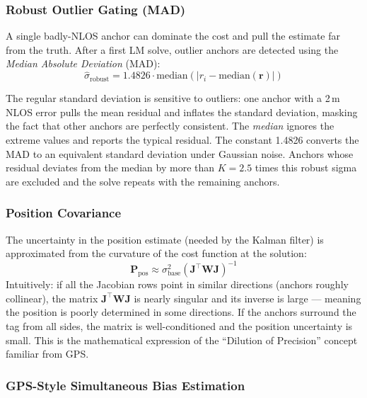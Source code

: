 \documentclass[11pt,a4paper]{article}
\newcommand{\vect}[1]{\bm{#1}}
\newcommand{\mat}[1]{\mathbf{#1}}
\newcommand{\abs}[1]{\left|#1\right|}
\newcommand{\Trans}{^{\top}}
\begin{document}
\subsubsection{Robust Outlier Gating (MAD)}

A single badly-NLOS anchor can dominate the cost and pull the estimate far from the truth. After a first LM solve, outlier anchors are detected using the \emph{Median Absolute Deviation} (MAD):
\begin{equation}
\hat{\sigma}_\text{robust} = 1.4826 \cdot \text{median}\!\left(\abs{r_i - \text{median}(\vect{r})}\right)
\end{equation}
\begin{intubox}
The regular standard deviation is sensitive to outliers: one anchor with a 2\,m NLOS error pulls the mean residual and inflates the standard deviation, masking the fact that other anchors are perfectly consistent. The \emph{median} ignores the extreme values and reports the typical residual. The constant 1.4826 converts the MAD to an equivalent standard deviation under Gaussian noise. Anchors whose residual deviates from the median by more than $K=2.5$ times this robust sigma are excluded and the solve repeats with the remaining anchors.
\end{intubox}

\subsubsection{Position Covariance}

The uncertainty in the position estimate (needed by the Kalman filter) is approximated from the curvature of the cost function at the solution:
\begin{equation}
\mat{P}_\text{pos} \approx \sigma_\text{base}^2 \left(\mat{J}\Trans \mat{W} \mat{J}\right)^{-1}
\label{eq:cov}
\end{equation}
Intuitively: if all the Jacobian rows point in similar directions (anchors roughly collinear), the matrix $\mat{J}\Trans\mat{W}\mat{J}$ is nearly singular and its inverse is large --- meaning the position is poorly determined in some directions. If the anchors surround the tag from all sides, the matrix is well-conditioned and the position uncertainty is small. This is the mathematical expression of the ``Dilution of Precision'' concept familiar from GPS.

\subsubsection{GPS-Style Simultaneous Bias Estimation}
\end{document}
